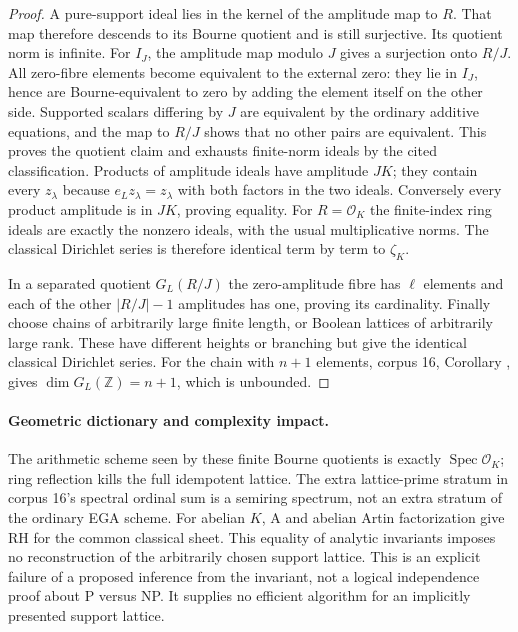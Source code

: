 \begin{proof}
A pure-support ideal lies in the kernel of the amplitude map to
$R$. That map therefore descends to its Bourne quotient and is
still surjective. Its quotient norm is infinite. For $I_J$, the
amplitude map modulo $J$ gives a surjection onto $R/J$.
All zero-fibre elements become equivalent to the external zero:
they lie in $I_J$, hence are Bourne-equivalent to zero by adding
the element itself on the other side. Supported scalars differing
by $J$ are equivalent by the ordinary additive equations, and the
map to $R/J$ shows that no other pairs are equivalent. This proves
the quotient claim and exhausts finite-norm ideals by the cited
classification. Products of amplitude ideals have amplitude $JK$;
they contain every $z_\lambda$ because $e_Lz_\lambda=z_\lambda$
with both factors in the two ideals. Conversely every product
amplitude is in $JK$, proving equality. For $R=\mathcal O_K$ the
finite-index ring ideals are exactly the nonzero ideals, with
the usual multiplicative norms. The classical Dirichlet series
is therefore identical term by term to $\zeta_K$.

In a separated quotient $G_L(R/J)$ the zero-amplitude fibre has
$\ell$ elements and each of the other $|R/J|-1$ amplitudes has
one, proving its cardinality. Finally choose chains of arbitrarily
large finite length, or Boolean lattices of arbitrarily large rank.
These have different heights or branching but give the identical
classical Dirichlet series. For the chain with $n+1$ elements,
corpus 16, Corollary , gives
$\dim G_L(\mathbb Z)=n+1$, which is unbounded.
\end{proof}

\paragraph{Geometric dictionary and complexity impact.}
The arithmetic scheme seen by these finite Bourne quotients is
exactly $\operatorname{Spec}\mathcal O_K$; ring reflection kills
the full idempotent lattice. The extra lattice-prime stratum in
corpus 16's spectral ordinal sum is a semiring spectrum, not an
extra stratum of the ordinary EGA scheme. For abelian $K$, A and
abelian Artin factorization give RH for the common classical
sheet. This equality of analytic invariants imposes no reconstruction
of the arbitrarily chosen support lattice. This is an explicit
failure of a proposed inference from the invariant, not a logical
independence proof about P versus NP. It supplies no efficient
algorithm for an implicitly presented support lattice.


